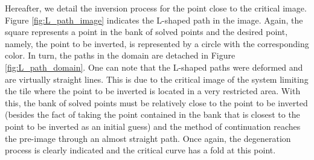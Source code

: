 \documentclass[journal=iecred,manuscript=article]{achemso}
\theoremstyle{definition}
\theoremstyle{remark}
\begin{document}
Hereafter, we detail the inversion process for the point close to the critical image. Figure \ref{fig:L_path_image} indicates the L-shaped path in the image. Again, the square represents a point in the bank of solved points and the desired point, namely, the point to be inverted, is represented by a circle with the corresponding color. In turn, the paths in the domain are detached in Figure \ref{fig:L_path_domain}. One can note that the L-shaped paths were deformed and are virtually straight lines. This is due to the critical image of the system limiting the tile where the point to be inverted is located in a very restricted area. With this, the bank of solved points must be relatively close to the point to be inverted (besides the fact of taking the point contained in the bank that is closest to the point to be inverted as an initial guess) and the method of continuation reaches the pre-image through an almost straight path. Once again, the degeneration process is clearly indicated and the critical curve has a fold at this point.
\end{document}
